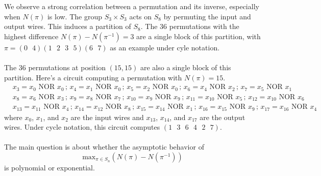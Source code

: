 \documentclass[12pt]{amsart}
\newcommand{\NOR}{\text{ NOR }}
\begin{document}
We observe a strong correlation between a permutation and its inverse, especially when $N(\pi)$ is low. The group $S_3 \times S_3$ acts on $S_8$ by permuting the input and output wires. This induces a partition of $S_8$. The 36 permutations with the highest difference $N(\pi)-N(\pi^{-1})=3$ are a single block of this partition, with $\pi=(0\text{ }4)(1\text{ } 2\text{ } 3 \text{ }5)(6\text{ } 7)$ as an example under cyle notation. 
\\ \\ The 36 permutations at position $(15,15)$ are also a single block of this partition. Here's a circuit computing a permutation with $N(\pi)=15$.
\begin{align*}
&x_3=x_0\NOR x_0\, ;\, x_4=x_1\NOR x_0\,;\,x_5=x_2\NOR x_0\,;\,x_6=x_4\NOR x_2\,;\,x_7=x_5\NOR x_1 \\
&x_8=x_6\NOR x_3\,;\,x_{9}=x_8\NOR x_7\,;\,x_{10}=x_{9}\NOR x_9\,;\,x_{11}=x_{10}\NOR x_5\,;\,x_{12}=x_{10}\NOR x_6 \\
&x_{13}=x_{11}\NOR x_4\,;\,x_{14}=x_{12}\NOR x_8\,;\,x_{15}=x_{14}\NOR x_{1}\,;\,x_{16}=x_{15}\NOR x_{9} \,;\,x_{17}=x_{16}\NOR x_{4} 
\end{align*}
where $x_0$, $x_1$, and $x_2$ are the input wires and $x_{13}$, $x_{14}$, and $x_{17}$ are the output wires. Under cycle notation, this circuit computes $(1\text{ } 3 \text{ }6 \text{ }4\text{ } 2\text{ } 7)$. \\ \\
The main question is about whether the asymptotic behavior of 
\[ \text{max}_{\pi \in S_n} (N(\pi)-N(\pi^{-1}))\]
is polynomial or exponential.
\end{document}
